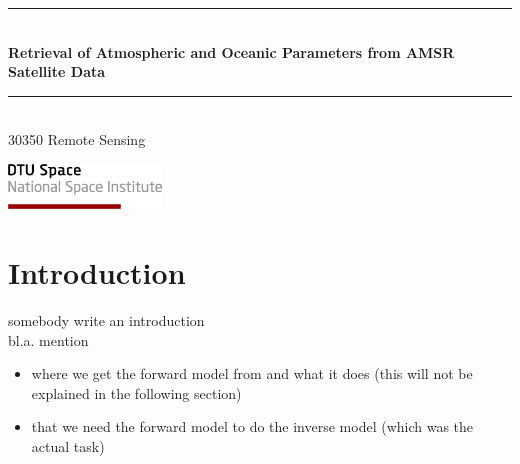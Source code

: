 \documentclass[11pt, a4paper]{article}
\begin{document}
\begin{titlepage}
	
	\begin{center}
		\rule{\textwidth}{1mm}\\
		\Huge\bfseries Retrieval of Atmospheric and Oceanic Parameters from AMSR Satellite Data\\ 				%
		\rule{\textwidth}{1mm}\\
		\vspace{0.5cm}
		\Large 30350 Remote Sensing \\[0.5cm]
		
		
		
		\vspace{0.5cm}
	\end{center}
	
	\begin{minipage}{0.3\textwidth}
		\begin{flushleft}
			\includegraphics[height=1.2cm]{DTU-Space.png} 	%
	\end{flushleft}\end{minipage}
\end{titlepage}

\pagestyle{fancy}
\fancyhf{} 
\fancyhead[LE,RO]{ \thepage}



\newpage
\section{Introduction}

somebody write an introduction \\

bl.a. mention
\begin{itemize}
\item where we get the forward model from and what it does (this will not be explained in the following section)
\item that we need the forward model to do the inverse model (which was the actual task)
\end{itemize}
\end{document}
